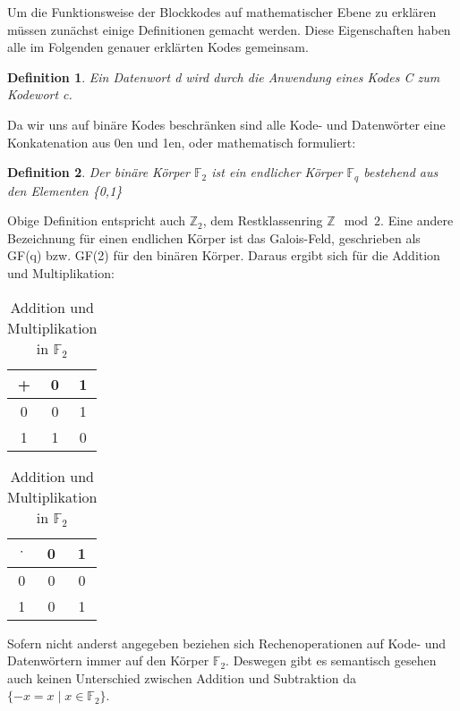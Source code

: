 

Um die Funktionsweise der Blockkodes auf mathematischer Ebene zu erklären müssen zunächst einige Definitionen gemacht werden. Diese Eigenschaften haben alle im Folgenden genauer erklärten Kodes gemeinsam.
\newtheorem{t_def}{Definition}[chapter]

\begin{t_def}
Ein {\em Datenwort d} wird durch die Anwendung eines {\em Kodes C} zum {\em Kodewort c}.
\end{t_def}

Da wir uns auf binäre Kodes beschränken sind alle Kode- und Datenwörter eine Konkatenation aus 0en und 1en, oder mathematisch formuliert:

\begin{t_def}
Der binäre Körper $\mathbb{F}_{2}$ ist ein endlicher Körper $\mathbb{F}_{q}$ bestehend aus den Elementen \{0,1\}
\end{t_def}

Obige Definition entspricht auch $\mathbb{Z}_2$, dem Restklassenring $\mathbb{Z}\mod 2$. Eine andere Bezeichnung für einen endlichen Körper ist das Galois-Feld, geschrieben als GF(q) bzw. GF(2) für den binären Körper. Daraus ergibt sich für die Addition und Multiplikation:\newline

\begin{table}[!h]
\begin{center}
\begin{tabular}{c|cc}
+ & 0 & 1 \\
\hline
0 & 0 & 1 \\
1 & 1 & 0 \\
\end{tabular}
\hspace{2cm}
\begin{tabular}{c|cc}
$\cdot$ & 0 & 1 \\
\hline
0 & 0 & 0 \\
1 & 0 & 1 \\
\end{tabular}
\caption{Addition und Multiplikation in $\mathbb{F}_2$}
\label{table:addmul}
\end{center}
\end{table}

Sofern nicht anderst angegeben beziehen sich Rechenoperationen auf Kode- und Datenwörtern immer auf den Körper $\mathbb{F}_2$. Deswegen gibt es semantisch gesehen auch keinen Unterschied zwischen Addition und Subtraktion da $\{-x = x \mid x \in \mathbb{F}_2\}$.\cite[Kap. 1.1]{huffman2010fundamentals}

